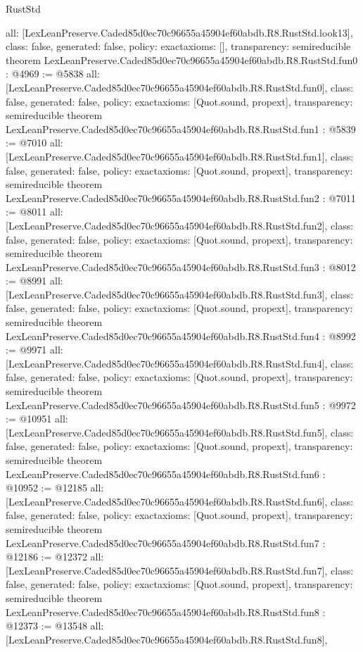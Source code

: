\begin{lexlean}{RustStd}
\begin{coremodule}
{  all: [LexLeanPreserve.Caded85d0ec70c96655a45904ef60abdb.R8.RustStd.look13],
  class: false,
  generated: false,
  policy: exact{axioms: []},
  transparency: semireducible
}
theorem LexLeanPreserve.Caded85d0ec70c96655a45904ef60abdb.R8.RustStd.fun0 : @4969 := @5838 {
  all: [LexLeanPreserve.Caded85d0ec70c96655a45904ef60abdb.R8.RustStd.fun0],
  class: false,
  generated: false,
  policy: exact{axioms: [Quot.sound, propext]},
  transparency: semireducible
}
theorem LexLeanPreserve.Caded85d0ec70c96655a45904ef60abdb.R8.RustStd.fun1 : @5839 := @7010 {
  all: [LexLeanPreserve.Caded85d0ec70c96655a45904ef60abdb.R8.RustStd.fun1],
  class: false,
  generated: false,
  policy: exact{axioms: [Quot.sound, propext]},
  transparency: semireducible
}
theorem LexLeanPreserve.Caded85d0ec70c96655a45904ef60abdb.R8.RustStd.fun2 : @7011 := @8011 {
  all: [LexLeanPreserve.Caded85d0ec70c96655a45904ef60abdb.R8.RustStd.fun2],
  class: false,
  generated: false,
  policy: exact{axioms: [Quot.sound, propext]},
  transparency: semireducible
}
theorem LexLeanPreserve.Caded85d0ec70c96655a45904ef60abdb.R8.RustStd.fun3 : @8012 := @8991 {
  all: [LexLeanPreserve.Caded85d0ec70c96655a45904ef60abdb.R8.RustStd.fun3],
  class: false,
  generated: false,
  policy: exact{axioms: [Quot.sound, propext]},
  transparency: semireducible
}
theorem LexLeanPreserve.Caded85d0ec70c96655a45904ef60abdb.R8.RustStd.fun4 : @8992 := @9971 {
  all: [LexLeanPreserve.Caded85d0ec70c96655a45904ef60abdb.R8.RustStd.fun4],
  class: false,
  generated: false,
  policy: exact{axioms: [Quot.sound, propext]},
  transparency: semireducible
}
theorem LexLeanPreserve.Caded85d0ec70c96655a45904ef60abdb.R8.RustStd.fun5 : @9972 := @10951 {
  all: [LexLeanPreserve.Caded85d0ec70c96655a45904ef60abdb.R8.RustStd.fun5],
  class: false,
  generated: false,
  policy: exact{axioms: [Quot.sound, propext]},
  transparency: semireducible
}
theorem LexLeanPreserve.Caded85d0ec70c96655a45904ef60abdb.R8.RustStd.fun6 : @10952 := @12185 {
  all: [LexLeanPreserve.Caded85d0ec70c96655a45904ef60abdb.R8.RustStd.fun6],
  class: false,
  generated: false,
  policy: exact{axioms: [Quot.sound, propext]},
  transparency: semireducible
}
theorem LexLeanPreserve.Caded85d0ec70c96655a45904ef60abdb.R8.RustStd.fun7 : @12186 := @12372 {
  all: [LexLeanPreserve.Caded85d0ec70c96655a45904ef60abdb.R8.RustStd.fun7],
  class: false,
  generated: false,
  policy: exact{axioms: [Quot.sound, propext]},
  transparency: semireducible
}
theorem LexLeanPreserve.Caded85d0ec70c96655a45904ef60abdb.R8.RustStd.fun8 : @12373 := @13548 {
  all: [LexLeanPreserve.Caded85d0ec70c96655a45904ef60abdb.R8.RustStd.fun8],
}
\end{coremodule}
\end{lexlean}
